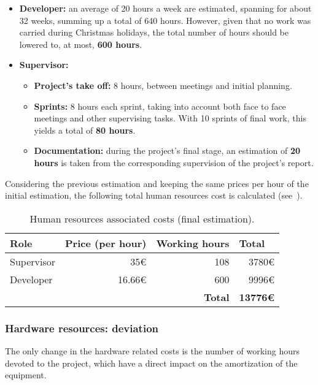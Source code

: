 \begin{itemize}
	\item \textbf{Developer:} an average of 20 hours a week are estimated, spanning for about 32 weeks, summing up a total of 640 hours. However, given that no work was carried during Christmas holidays, the total number of hours should be lowered to, at most, \textbf{600 hours}.
	\item \textbf{Supervisor:}
	\begin{itemize}
		\item \textbf{Project’s take off:} 8 hours, between meetings and initial planning.
		\item \textbf{Sprints:} 8 hours each sprint, taking into account both face to face meetings and other supervising tasks. With 10 sprints of final work, this yields a total of \textbf{80 hours}.
		\item \textbf{Documentation:} during the project’s final stage, an estimation of \textbf{20 hours} is taken from the corresponding supervision of the project’s report.
	\end{itemize}
\end{itemize}

Considering the previous estimation and keeping the same prices per hour of the initial estimation, the following total human resources cost is calculated (see~).

\begin{table}[h]
	\centering
	\begin{tabular}{lllr}
		\hline
		\textbf{Role} & \textbf{Price (per hour)} & \textbf{Working  hours} & \multicolumn{1}{l}{\textbf{Total}} \\ \hline
		Supervisor & \multicolumn{1}{r}{35€} & \multicolumn{1}{r}{108} & 3780€ \\
		Developer & \multicolumn{1}{r}{16.66€} & \multicolumn{1}{r}{600} & 9996€ \\ \hline
		&  & \multicolumn{1}{r}{\textbf{Total}} & \textbf{13776€}
	\end{tabular}
	\caption{Human resources associated costs (final estimation).}
	\label{table:human-resources-final}
\end{table}

\subsubsection*{Hardware resources: deviation}

The only change in the hardware related costs is the number of working hours devoted to the project, which have a direct impact on the amortization of the equipment.

